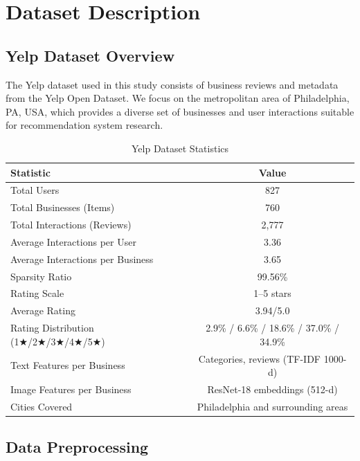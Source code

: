 \section{Dataset Description}
\label{app:dataset}

\subsection{Yelp Dataset Overview}

The Yelp dataset used in this study consists of business reviews and metadata from the Yelp Open Dataset. We focus on the metropolitan area of Philadelphia, PA, USA, which provides a diverse set of businesses and user interactions suitable for recommendation system research.

\begin{table}[htbp]
\centering
\small
\caption{Yelp Dataset Statistics}
\label{tab:dataset_stats}
\begin{tabular}{lc}
\toprule
\textbf{Statistic} & \textbf{Value} \\
\midrule
Total Users & 827 \\
Total Businesses (Items) & 760 \\
Total Interactions (Reviews) & 2,777 \\
Average Interactions per User & 3.36 \\
Average Interactions per Business & 3.65 \\
Sparsity Ratio & 99.56\% \\
Rating Scale & 1--5 stars \\
Average Rating & 3.94/5.0 \\
Rating Distribution (1★/2★/3★/4★/5★) & 2.9\% / 6.6\% / 18.6\% / 37.0\% / 34.9\% \\
Text Features per Business & Categories, reviews (TF-IDF 1000-d) \\
Image Features per Business & ResNet-18 embeddings (512-d) \\
Cities Covered & Philadelphia and surrounding areas \\
\bottomrule
\end{tabular}
\end{table}

\subsection{Data Preprocessing}

